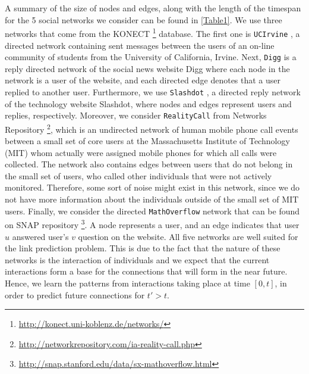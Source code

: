 \documentclass{acm_proc_article-sp}
\begin{document}


A summary of the size of nodes and edges, along with the length of the timespan for the 5 social networks we consider can be found in \autoref{Table1}. We use three networks that come from the KONECT \footnote{\url{http://konect.uni-koblenz.de/networks/}} database. The first one is \texttt{UCIrvine} \cite{opsahl2009clustering}, a directed network containing sent messages between the users of an on-line community of students from the University of California, Irvine. Next, \texttt{Digg} \cite{de2009social} is a reply directed network of the social news website Digg where each node in the network is a user of the website, and each directed edge denotes that a user replied to another user. Furthermore, we use \texttt{Slashdot} \cite{gomez2008statistical}, a directed reply network of the technology website Slashdot, where nodes and edges represent users and replies, respectively. Moreover, we consider \texttt{RealityCall} \cite{eagle2006reality, nr} from Networks Repository \footnote{\url{http://networkrepository.com/ia-reality-call.php}}, which is an undirected network of human mobile phone call events between a small set of core users at the Massachusetts Institute of Technology (MIT) whom actually were assigned mobile phones for which all calls were collected. The network also contains edges between users that do not belong in the small set of users, who called other individuals that were not actively monitored. Therefore, some sort of noise might exist in this network, since we do not have more information about the individuals outside of the small set of MIT users. Finally, we consider the directed \texttt{MathOverflow} network \cite{Paranjape:2017:MTN:3018661.3018731} that can be found on SNAP repository \footnote{\url{http://snap.stanford.edu/data/sx-mathoverflow.html}}. A node represents a user, and an edge indicates that user $u$ answered user's $v$ question on the website. All five networks are well suited for the link prediction problem. This is due to the fact that the nature of these networks is the interaction of individuals and we expect that the current interactions form a base for the connections that will form in the near future. Hence, we learn the patterns from interactions taking place at time $[0,t]$, in order to predict future connections for $t' > t$.
\end{document}
